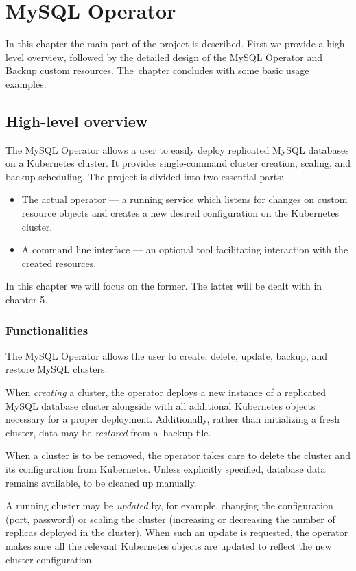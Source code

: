 \chapter{MySQL Operator}

In this chapter the main part of the project is described. First we provide
a high-level overview, followed by the detailed design of the MySQL Operator
and Backup custom resources. The~chapter concludes with some basic usage examples.

\section{High-level overview}
The MySQL Operator allows a user to easily deploy replicated MySQL databases on a Kubernetes cluster.
It provides single-command cluster creation, scaling, and backup scheduling. The project is divided
into two essential parts:
\begin{itemize}
	\item The actual operator --- a running service which listens for changes on custom resource
	objects and creates a new desired configuration on the Kubernetes cluster.
	\item A command line interface --- an optional tool facilitating interaction with the created
	resources.
\end{itemize}

In this chapter we will focus on the former. The latter will be dealt with in chapter 5.

\subsection{Functionalities}
The MySQL Operator allows the user to create, delete, update, backup, and restore MySQL clusters.

When \textit{creating} a cluster, the operator deploys a new instance of a replicated MySQL
database cluster alongside with all additional Kubernetes objects necessary for a proper deployment.
Additionally, rather than initializing a fresh cluster, data may be \textit{restored} from a~backup file.

When a cluster is to be removed, the operator takes care to delete the cluster and its
configuration from Kubernetes. Unless explicitly specified, database data remains available, to be
cleaned up manually.

A running cluster may be \textit{updated} by, for example, changing the configuration (port,
password) or scaling the cluster (increasing or decreasing the number of replicas deployed in the
cluster). When such an update is requested, the operator makes sure all the relevant Kubernetes
objects are updated to reflect the new cluster configuration.


